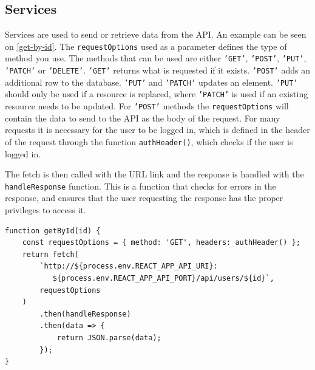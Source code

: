 \subsection{Services}
Services are used to send or retrieve data from the API. 
An example can be seen on \autoref{get-by-id}.
The \texttt{requestOptions} used as a parameter defines the type of method you use.
The methods that can be used are either \texttt{'GET'}, \texttt{'POST'}, \texttt{'PUT'}, \texttt{'PATCH'} or \texttt{'DELETE'}.
\texttt{'GET'} returns what is requested if it exists.
\texttt{'POST'} adds an additional row to the database.
\texttt{'PUT'} and \texttt{'PATCH'} updates an element. 
\texttt{'PUT'} should only be used if a resource is replaced, where \texttt{'PATCH'} is used if an existing resource needs to be updated.
For \texttt{'POST'} methods the \texttt{requestOptions} will contain the data to send to the API as the body of the request.
For many requests it is necessary for the user to be logged in, which is defined in the header of the request through the function \texttt{authHeader()}, which checks if the user is logged in.

The fetch is then called with the URL link and the response is handled with the \texttt{handleResponse} function. 
This is a function that checks for errors in the response, and ensures that the user requesting the response has the proper privileges to access it.

\begin{lstlisting}[caption={Function to get a user by ID.}, captionpos=b, label={get-by-id}]
function getById(id) {
	const requestOptions = { method: 'GET', headers: authHeader() };
	return fetch(
        `http://${process.env.REACT_APP_API_URI}:
           ${process.env.REACT_APP_API_PORT}/api/users/${id}`,
		requestOptions
	)
		.then(handleResponse)
		.then(data => {
			return JSON.parse(data);
		});
}
\end{lstlisting}

